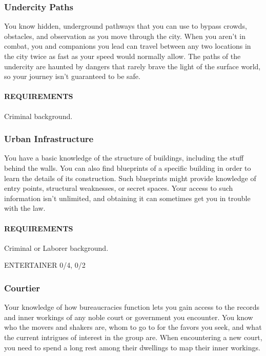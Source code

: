     \subsubsection{Undercity Paths} \label{feat::undercitypaths}
    You know hidden, underground pathways that you can use to bypass crowds, obstacles, and observation as you move through the city.
    When you aren't in combat, you and companions you lead can travel between any two locations in the city twice as fast as your speed would normally allow.
    The paths of the undercity are haunted by dangers that rarely brave the light of the surface world, so your journey isn't guaranteed to be safe.
    \paragraph{REQUIREMENTS} Criminal background.

    \subsubsection{Urban Infrastructure} \label{feat::urbaninfrastructure}
        You have a basic knowledge of the structure of buildings, including the stuff behind the walls.
        You can also find blueprints of a specific building in order to learn the details of its construction.
        Such blueprints might provide knowledge of entry points, structural weaknesses, or secret spaces.
        Your access to such information isn't unlimited, and obtaining it can sometimes get you in trouble with the law.
        \paragraph{REQUIREMENTS} Criminal or Laborer background.

ENTERTAINER 0/4, 0/2
    \subsubsection{Courtier} \label{feat::courtier}
    Your knowledge of how bureaucracies function lets you gain access to the records and inner workings of any noble court or government you encounter.
    You know who the movers and shakers are, whom to go to for the favors you seek, and what the current intrigues of interest in the group are.
    When encountering a new court, you need to spend a long rest among their dwellings to map their inner workings.
